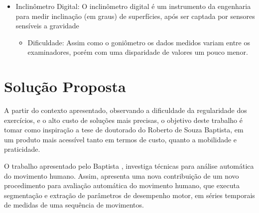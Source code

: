 \begin{itemize}
\item Inclinômetro Digital: O inclinômetro digital é um instrumento da
engenharia para medir inclinação (em graus) de superfícies, após ser captada
por sensores sensíveis a gravidade\cite{erroMedicao2012}
  \begin{itemize}
  \item Dificuldade: Assim como o goniômetro os dados medidos variam entre os
  examinadores, porém com uma disparidade de valores um pouco menor.
  \end{itemize}

\end{itemize}

\section{Solução Proposta}
\label{Sec:SolucaoProposta}
  A partir do contexto apresentado, observando a dificuldade da regularidade dos
   exercícios, e o alto custo de soluções mais precisas, o
objetivo deste trabalho é tomar como inspiração a tese de doutorado do Roberto de Souza
Baptista, em um produto mais acessível
tanto em termos de custo, quanto a mobilidade e praticidade.

  O trabalho apresentado pelo Baptista \cite{roberto}, investiga técnicas para análise automática do
movimento humano. Assim, apresenta uma nova contribuição de um novo
procedimento para avaliação automática do movimento humano, que executa
segmentação e extração de parâmetros de desempenho motor, em séries temporais
de medidas de uma sequência de movimentos.

